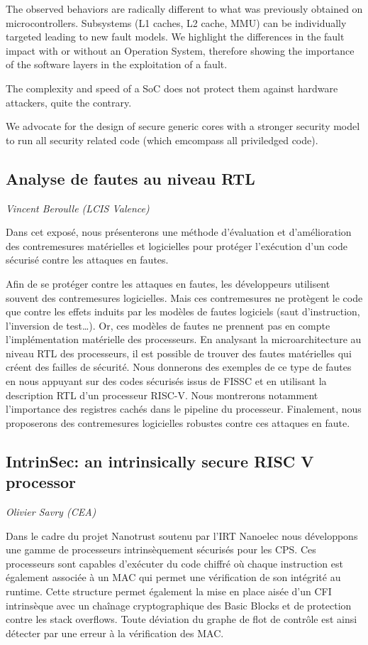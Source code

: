 \documentclass[a4paper,11pt]{article}
\begin{document}
The observed behaviors are radically different to what was previously obtained
on microcontrollers. Subsystems (L1 caches, L2 cache, MMU) can be
individually targeted leading to new fault models. We highlight the
differences in the fault impact with or without an Operation System, therefore showing
the importance of the software layers in the exploitation of a fault.

The complexity and speed of a SoC does not protect them against hardware
attackers, quite the contrary.

We advocate for the design of secure generic cores with a stronger security
model to run all security related code (which emcompass all priviledged code).

\subsection{Analyse de fautes au niveau RTL}
\label{sec:orge46cf20}
\emph{Vincent Beroulle (LCIS Valence)}

Dans cet exposé, nous présenterons une méthode d’évaluation et
d’amélioration des contremesures matérielles et logicielles pour
protéger l’exécution d’un code sécurisé contre les attaques en fautes.

Afin de se protéger contre les attaques en fautes, les développeurs
utilisent souvent des contremesures logicielles. Mais ces
contremesures ne protègent le code que contre les effets induits par
les modèles de fautes logiciels (saut d’instruction, l’inversion de
test\ldots{}). Or, ces modèles de fautes ne prennent pas en compte
l’implémentation matérielle des processeurs. En analysant la
microarchitecture au niveau RTL des processeurs, il est possible de
trouver des fautes matérielles qui créent des failles de
sécurité. Nous donnerons des exemples de ce type de fautes en nous
appuyant sur des codes sécurisés issus de FISSC et en utilisant la
description RTL d’un processeur RISC-V. Nous montrerons notamment
l’importance des registres cachés dans le pipeline du
processeur. Finalement, nous proposerons des contremesures logicielles
robustes contre ces attaques en faute.

\subsection{IntrinSec: an intrinsically secure RISC V processor}
\label{sec:org45d4d84}
\emph{Olivier Savry (CEA)}

Dans le cadre du projet Nanotrust soutenu par l’IRT Nanoelec nous
développons une gamme de processeurs intrinsèquement sécurisés pour
les CPS. Ces processeurs sont capables d’exécuter du code chiffré où
chaque instruction est également associée à un MAC qui permet une
vérification de son intégrité au runtime. Cette structure permet
également la mise en place aisée d’un CFI intrinsèque avec un chaînage
cryptographique des Basic Blocks et de protection contre les stack
overflows. Toute déviation du graphe de flot de contrôle est ainsi
détecter par une erreur à la vérification des MAC.
\end{document}
